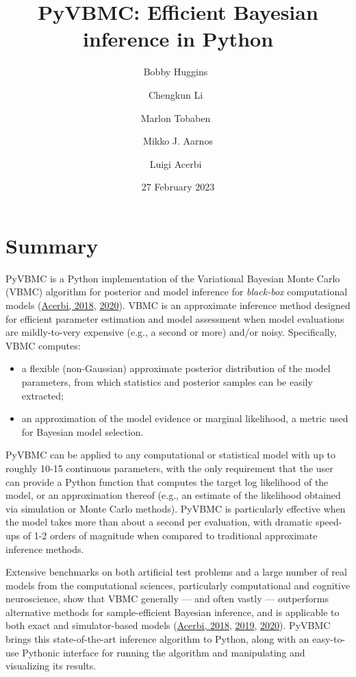 \documentclass[
]{article}
\title{PyVBMC: Efficient Bayesian inference in Python}
\author[1%
  *%
  \ensuremath\mathparagraph]{Bobby Huggins%
    \,%
    }
\author[1%
  *%
  ]{Chengkun Li%
    \,%
    }
\author[1%
  *%
  ]{Marlon Tobaben%
    \,%
    }
\author[1%
  ]{Mikko J. Aarnos%
    }
\author[1%
  \ensuremath\mathparagraph]{Luigi Acerbi%
    \,%
    }
\affil[1]{University of Helsinki}
\affil[$\mathparagraph$]{Corresponding author}
\affil[*]{These authors contributed equally.}
\date{27 February 2023}
\providecommand{\tightlist}{%
  \setlength{\itemsep}{0pt}\setlength{\parskip}{0pt}}
\begin{document}
\maketitle

\hypertarget{summary}{%
\section{Summary}\label{summary}}

PyVBMC is a Python implementation of the Variational Bayesian Monte
Carlo (VBMC) algorithm for posterior and model inference for
\emph{black-box} computational models
(\protect\hyperlink{ref-acerbi_variational_2018}{Acerbi, 2018},
\protect\hyperlink{ref-acerbi_variational_2020}{2020}). VBMC is an
approximate inference method designed for efficient parameter estimation
and model assessment when model evaluations are mildly-to-very expensive
(e.g., a second or more) and/or noisy. Specifically, VBMC computes:

\begin{itemize}
\tightlist
\item
  a flexible (non-Gaussian) approximate posterior distribution of the
  model parameters, from which statistics and posterior samples can be
  easily extracted;
\item
  an approximation of the model evidence or marginal likelihood, a
  metric used for Bayesian model selection.
\end{itemize}

PyVBMC can be applied to any computational or statistical model with up
to roughly 10-15 continuous parameters, with the only requirement that
the user can provide a Python function that computes the target log
likelihood of the model, or an approximation thereof (e.g., an estimate
of the likelihood obtained via simulation or Monte Carlo methods).
PyVBMC is particularly effective when the model takes more than about a
second per evaluation, with dramatic speed-ups of 1-2 orders of
magnitude when compared to traditional approximate inference methods.

Extensive benchmarks on both artificial test problems and a large number
of real models from the computational sciences, particularly
computational and cognitive neuroscience, show that VBMC generally ---
and often vastly --- outperforms alternative methods for
sample-efficient Bayesian inference, and is applicable to both exact and
simulator-based models
(\protect\hyperlink{ref-acerbi_variational_2018}{Acerbi, 2018},
\protect\hyperlink{ref-acerbi_exploration_2019}{2019},
\protect\hyperlink{ref-acerbi_variational_2020}{2020}). PyVBMC brings
this state-of-the-art inference algorithm to Python, along with an
easy-to-use Pythonic interface for running the algorithm and
manipulating and visualizing its results.
\end{document}
